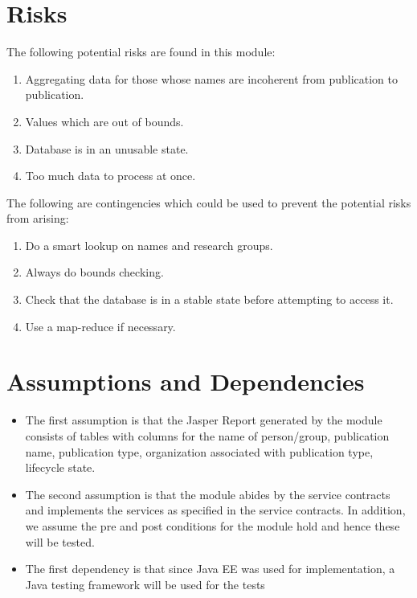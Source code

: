 \section{Risks}
\label{risks}
	The following potential risks are found in this module:
\begin{enumerate}
	\item Aggregating data for those whose names are incoherent from publication to publication.
	\item Values  which are out of bounds.
	\item Database is in an unusable state.
	\item Too much data to process at once.
\end{enumerate}

	The following are contingencies which could be used to prevent the potential risks from arising:
\begin{enumerate}

	\item Do a smart lookup on names and research groups.
	\item Always do bounds checking.
	\item Check that the database is in a stable state before attempting to access it.
	\item Use a map-reduce if necessary.


\end{enumerate}

\section{Assumptions and Dependencies}
\label{sec:assumptions}
\begin{itemize}
	\item The first assumption is that the Jasper Report generated by the module consists of tables with columns for the name of person/group, publication name, publication type, organization associated with publication type, lifecycle state.
	\item The second assumption is that the module abides by the service contracts and implements the services as specified in the service contracts. In addition, we assume the pre and post conditions for the module hold and hence these will be tested.
	\item The first dependency is that since Java EE was used for implementation, a Java testing framework will be used for the tests
\end{itemize}
\hypertarget{labelr}{}
